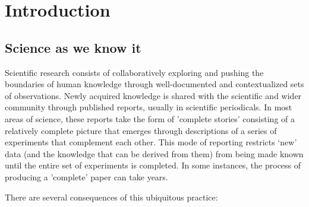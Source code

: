 \documentclass[final,authoryear,3p]{elsarticle-open-drafting}
\begin{document}
\newpage
\tableofcontents

\section{Introduction}
\subsection{Science as we know it}

Scientific research consists of collaboratively exploring and pushing the boundaries of human knowledge through well-documented and contextualized sets of observations. Newly acquired knowledge is shared with the scientific and wider community through published reports, usually in scientific periodicals. In most areas of science, these reports take the form of 'complete stories' consisting of a relatively complete picture that emerges through descriptions of a series of experiments that complement each other. This mode of reporting restricts ‘new’ data (and the knowledge that can be derived from them) from being made known until the entire set of experiments is completed. In some instances, the process of producing a 'complete' paper can take years.

There are several consequences of this ubiquitous practice:
\end{document}
